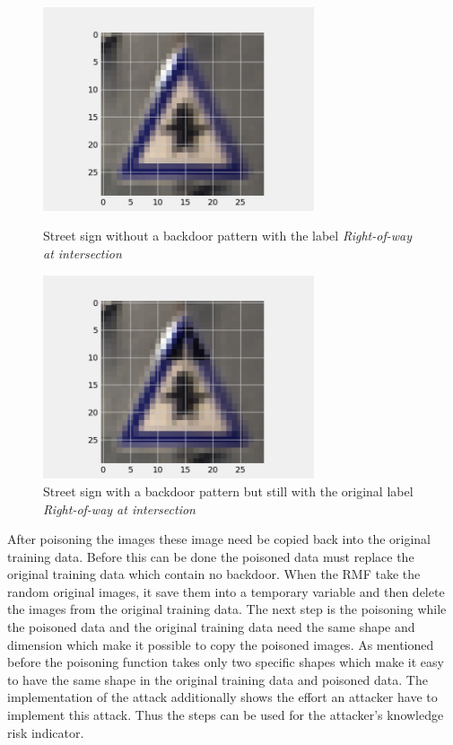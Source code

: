 \begin{figure}[!tbp]
  \centering
  \begin{minipage}[b]{0.4\textwidth}
    \includegraphics[width=8cm]{pictures/original_example.png}
    \caption{Street sign without a backdoor pattern with the label \textit{Right-of-way at intersection}}
    \label{fig:original_example}
  \end{minipage}
  \hfill
  \begin{minipage}[b]{0.4\textwidth}
    \includegraphics[width=8cm]{pictures/poisoned_example.png}
    \caption{Street sign with a backdoor pattern but still with the original label \textit{Right-of-way at intersection}}
    \label{fig:poisoned_example}
  \end{minipage}
\end{figure}

After poisoning the images these image need be copied back into the original training data. Before this can be done the poisoned data must replace the original training data which contain
no backdoor. When the RMF take the random original images, it save them into a temporary variable and then delete the images from the original training data. The next step is the
poisoning while the poisoned data and the original training data need the same shape and dimension which make it possible to copy the poisoned images. As mentioned before the poisoning
function takes only two specific shapes which make it easy to have the same shape in the original training data and poisoned data. The implementation of the attack additionally shows the
effort an attacker have to implement this attack. Thus the steps can be used for the attacker's knowledge risk indicator.

